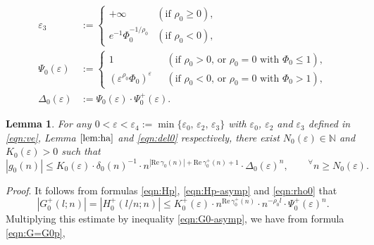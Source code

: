 \documentclass[a4paper,12pt]{article}
\theoremstyle{plain}
\newtheorem{lemma}[theorem]{Lemma}
\def\rRe{\mathrm{Re}}
\def\N{\mathbb{N}}
\def\ve{\varepsilon}
\def\vD{\varDelta}
\begin{document}
\begin{subequations} \label{eqn:del-Psi0}
\begin{align}
\ve_3 &:= 
\begin{cases}
+ \infty & (\mbox{if $\rho_0 \ge 0$}), \\[1mm]
e^{-1} \Phi_0^{-1/\rho_0} & (\mbox{if $\rho_0 < 0$}),  
\end{cases}
\label{eqn:del0} \\[2mm] 
\Psi_0(\ve) &:= 
\begin{cases}
1 & (\mbox{if $\rho_0 > 0$, or $\rho_0 = 0$ with $\Phi_0 \le 1$}), \\[1mm]
(\ve^{\rho_0} \Phi_0)^{\ve} \,\,\,\, & 
(\mbox{if $\rho_0 < 0$, or $\rho_0 = 0$ with $\Phi_0 > 1$}),  
\end{cases}
\label{eqn:Psi0} \\[2mm] 
\vD_0(\ve) &:= \Psi_0(\ve) \cdot \Psi_0^+(\ve). \label{eqn:vD0}
\end{align} 
\end{subequations}
\begin{lemma} \label{lem:g0-bound}  
For any $0 < \ve < \ve_4 := \min\{ \ve_0, \, \ve_2, \, \ve_3 \}$ with $\ve_0$, 
$\ve_2$ and $\ve_3$ defined in \eqref{eqn:ve}, Lemma $\ref{lem:ha}$  
and \eqref{eqn:del0} respectively, there exist $N_0(\ve) \in \N$ and 
$K_0(\ve) > 0$ such that 
\begin{equation*} \label{eqn:g0-bound}
|g_0(n)| \le K_0(\ve) \cdot \delta_0(n)^{-1} \cdot 
n^{ |\rRe \, \gamma_0(n)| + \rRe \, \gamma_0^+(n) +1 } \cdot 
\vD_0(\ve)^n, \qquad {}^{\forall} n \ge N_0(\ve).    
\end{equation*}
\end{lemma} 
{\it Proof}. 
It follows from formulas \eqref{eqn:Hp}, \eqref{eqn:Hp-asymp} and 
\eqref{eqn:rho0} that   
\[
|G_0^+(l; n)| = |H_0^+( l/n; n ) | \le K_0^+(\ve) \cdot 
n^{\rRe \, \gamma_0^+(n)} \cdot n^{- \rho_0 l} \cdot \Psi_0^+(\ve)^n.    
\]
Multiplying this estimate by inequality \eqref{eqn:G0-asymp}, we have 
from formula \eqref{eqn:G=G0p},   
\end{document}
